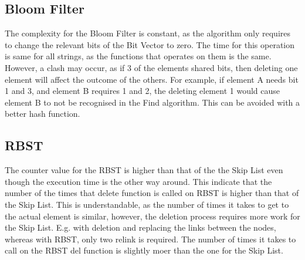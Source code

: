 \documentclass[11pt]{article}
\begin{document}
\subsection*{Bloom Filter}
The complexity for the Bloom Filter is constant, as the algorithm only requires to change the relevant bits of the Bit Vector to zero. The time for this operation is same for all strings, as the functions that operates on them is the same. However, a clash may occur, as if 3 of the elements shared bits, then deleting one element will affect the outcome of the others. For example, if element A needs bit 1 and 3, and element B requires 1 and 2, the deleting element 1 would cause element B to not be recognised in the Find algorithm. This can be avoided with a better hash function. 
\subsection*{RBST}
The counter value for the RBST is higher than that of the the Skip List even though the execution time is the other way around. This indicate that the number of the times that delete function is called on RBST is higher than that of the Skip List. This is understandable, as the number of times it takes to get to the actual element is similar, however, the deletion process requires more work for the Skip List. E.g. with deletion and replacing the links between the nodes, whereas with RBST, only two relink is required. The number of times it takes to call on the RBST del function is slightly moer than the one for the Skip List. 
\end{document}
